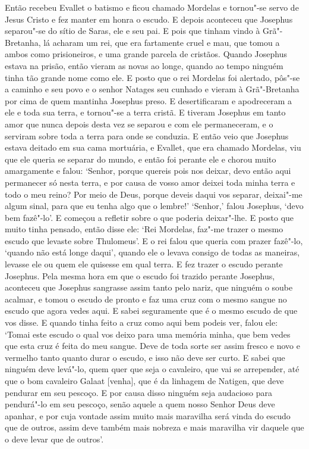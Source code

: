 Então recebeu Evallet o batismo e ficou chamado Mordelas e tornou"-se servo de
Jesus Cristo e fez manter em honra o escudo. E depois aconteceu que Josephus
separou"-se do sítio de Saras, ele e seu pai. E pois que tinham vindo à
Grã"-Bretanha, lá acharam um rei, que era fartamente cruel e mau, que tomou a
ambos como prisioneiros, e uma grande parcela de cristãos. Quando Josephus
estava na prisão, então vieram as novas ao longe, quando ao tempo ninguém tinha
tão grande nome como ele. E posto que o rei Mordelas foi alertado, pôs"-se a
caminho e seu povo e o senhor Natages seu cunhado e vieram à Grã"-Bretanha por
cima de quem mantinha Josephus preso. E desertificaram e apodreceram a ele e
toda sua terra, e tornou"-se a terra cristã. E tiveram Josephus em tanto amor
que nunca depois desta vez se separou e com ele permaneceram, e o serviram
sobre toda a terra para onde se conduzia. E então veio que Josephus estava
deitado em sua cama mortuária, e Evallet, que era chamado Mordelas, viu que ele
queria se separar do mundo, e então foi perante ele e chorou muito amargamente
e falou: ‘Senhor, porque quereis pois nos deixar, devo então aqui permanecer só
nesta terra, e por causa de vosso amor  deixei toda minha terra e todo o meu
reino? Por meio de Deus, porque deveis daqui vos separar, deixai"-me algum
sinal, para que eu tenha algo que o lembre!’ ‘Senhor,’ falou Josephus, ‘devo
bem fazê"-lo’. E começou a refletir sobre o que poderia deixar"-lhe. E posto que
muito tinha pensado, então disse ele: ‘Rei Mordelas, faz"-me trazer o mesmo
escudo que levaste sobre Thulomeus’. E o rei falou que queria com prazer
fazê"-lo, ‘quando não está longe daqui’, quando ele o levava consigo de todas as
maneiras, levasse ele ou quem ele quisesse em qual terra. E fez trazer o escudo
perante Josephus. Pela mesma hora em que o escudo foi trazido perante Josephus,
aconteceu que Josephus sangrasse assim tanto pelo nariz, que ninguém o soube
acalmar, e tomou o escudo de pronto e faz uma cruz com o mesmo sangue no escudo
que agora vedes aqui. E sabei seguramente que é o mesmo escudo de que vos
disse. E quando tinha feito a cruz como aqui bem podeis ver, falou ele: ‘Tomai
este escudo o qual vos deixo para uma memória minha, que bem vedes que esta
cruz é feita do meu sangue. Deve de toda sorte ser assim fresco e novo e
vermelho tanto quanto durar o escudo, e isso não deve ser curto. E sabei que
ninguém deve levá"-lo, quem quer que seja o cavaleiro, que vai se arrepender,
até que o bom cavaleiro Galaat [venha], que é da linhagem de Natigen, que deve
pendurar em seu pescoço. E por causa disso ninguém seja audacioso para
pendurá"-lo em seu pescoço, senão aquele a quem nosso Senhor Deus  deve apanhar,
e por cuja vontade assim muito mais maravilha será vinda do escudo que de
outros, assim deve também mais nobreza e mais maravilha vir daquele que o deve
levar que de outros’. 

